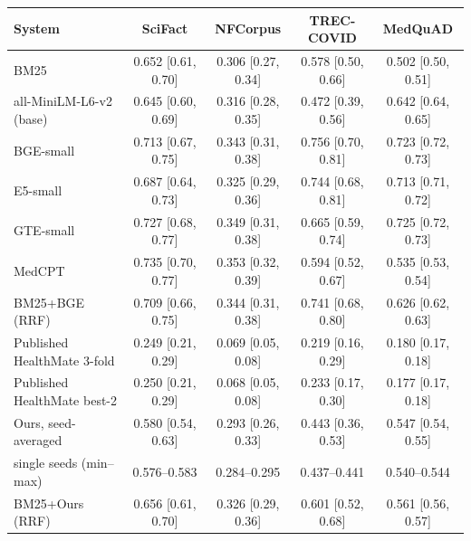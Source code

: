 \begin{tabular}{lcccc}
\toprule
System & SciFact & NFCorpus & TREC-COVID & MedQuAD \\
\midrule
BM25 & 0.652 [0.61, 0.70] & 0.306 [0.27, 0.34] & 0.578 [0.50, 0.66] & 0.502 [0.50, 0.51] \\
all-MiniLM-L6-v2 (base) & 0.645 [0.60, 0.69] & 0.316 [0.28, 0.35] & 0.472 [0.39, 0.56] & 0.642 [0.64, 0.65] \\
BGE-small & 0.713 [0.67, 0.75] & 0.343 [0.31, 0.38] & 0.756 [0.70, 0.81] & 0.723 [0.72, 0.73] \\
E5-small & 0.687 [0.64, 0.73] & 0.325 [0.29, 0.36] & 0.744 [0.68, 0.81] & 0.713 [0.71, 0.72] \\
GTE-small & 0.727 [0.68, 0.77] & 0.349 [0.31, 0.38] & 0.665 [0.59, 0.74] & 0.725 [0.72, 0.73] \\
MedCPT & 0.735 [0.70, 0.77] & 0.353 [0.32, 0.39] & 0.594 [0.52, 0.67] & 0.535 [0.53, 0.54] \\
BM25+BGE (RRF) & 0.709 [0.66, 0.75] & 0.344 [0.31, 0.38] & 0.741 [0.68, 0.80] & 0.626 [0.62, 0.63] \\
Published HealthMate 3-fold & 0.249 [0.21, 0.29] & 0.069 [0.05, 0.08] & 0.219 [0.16, 0.29] & 0.180 [0.17, 0.18] \\
Published HealthMate best-2 & 0.250 [0.21, 0.29] & 0.068 [0.05, 0.08] & 0.233 [0.17, 0.30] & 0.177 [0.17, 0.18] \\
Ours, seed-averaged & 0.580 [0.54, 0.63] & 0.293 [0.26, 0.33] & 0.443 [0.36, 0.53] & 0.547 [0.54, 0.55] \\
\quad single seeds (min--max) & 0.576--0.583 & 0.284--0.295 & 0.437--0.441 & 0.540--0.544 \\
BM25+Ours (RRF) & 0.656 [0.61, 0.70] & 0.326 [0.29, 0.36] & 0.601 [0.52, 0.68] & 0.561 [0.56, 0.57] \\
\bottomrule
\end{tabular}
